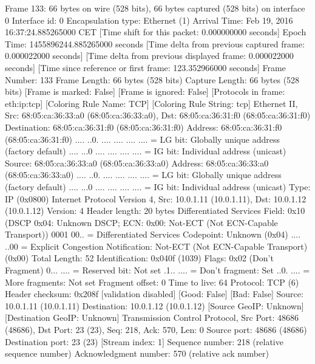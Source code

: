 Frame 133: 66 bytes on wire (528 bits), 66 bytes captured (528 bits) on interface 0
    Interface id: 0
    Encapsulation type: Ethernet (1)
    Arrival Time: Feb 19, 2016 16:37:24.885265000 CET
    [Time shift for this packet: 0.000000000 seconds]
    Epoch Time: 1455896244.885265000 seconds
    [Time delta from previous captured frame: 0.000022000 seconds]
    [Time delta from previous displayed frame: 0.000022000 seconds]
    [Time since reference or first frame: 123.352966000 seconds]
    Frame Number: 133
    Frame Length: 66 bytes (528 bits)
    Capture Length: 66 bytes (528 bits)
    [Frame is marked: False]
    [Frame is ignored: False]
    [Protocols in frame: eth:ip:tcp]
    [Coloring Rule Name: TCP]
    [Coloring Rule String: tcp]
Ethernet II, Src: 68:05:ca:36:33:a0 (68:05:ca:36:33:a0), Dst: 68:05:ca:36:31:f0 (68:05:ca:36:31:f0)
    Destination: 68:05:ca:36:31:f0 (68:05:ca:36:31:f0)
        Address: 68:05:ca:36:31:f0 (68:05:ca:36:31:f0)
        .... ..0. .... .... .... .... = LG bit: Globally unique address (factory default)
        .... ...0 .... .... .... .... = IG bit: Individual address (unicast)
    Source: 68:05:ca:36:33:a0 (68:05:ca:36:33:a0)
        Address: 68:05:ca:36:33:a0 (68:05:ca:36:33:a0)
        .... ..0. .... .... .... .... = LG bit: Globally unique address (factory default)
        .... ...0 .... .... .... .... = IG bit: Individual address (unicast)
    Type: IP (0x0800)
Internet Protocol Version 4, Src: 10.0.1.11 (10.0.1.11), Dst: 10.0.1.12 (10.0.1.12)
    Version: 4
    Header length: 20 bytes
    Differentiated Services Field: 0x10 (DSCP 0x04: Unknown DSCP; ECN: 0x00: Not-ECT (Not ECN-Capable Transport))
        0001 00.. = Differentiated Services Codepoint: Unknown (0x04)
        .... ..00 = Explicit Congestion Notification: Not-ECT (Not ECN-Capable Transport) (0x00)
    Total Length: 52
    Identification: 0x040f (1039)
    Flags: 0x02 (Don't Fragment)
        0... .... = Reserved bit: Not set
        .1.. .... = Don't fragment: Set
        ..0. .... = More fragments: Not set
    Fragment offset: 0
    Time to live: 64
    Protocol: TCP (6)
    Header checksum: 0x208f [validation disabled]
        [Good: False]
        [Bad: False]
    Source: 10.0.1.11 (10.0.1.11)
    Destination: 10.0.1.12 (10.0.1.12)
    [Source GeoIP: Unknown]
    [Destination GeoIP: Unknown]
Transmission Control Protocol, Src Port: 48686 (48686), Dst Port: 23 (23), Seq: 218, Ack: 570, Len: 0
    Source port: 48686 (48686)
    Destination port: 23 (23)
    [Stream index: 1]
    Sequence number: 218    (relative sequence number)
    Acknowledgment number: 570    (relative ack number)
